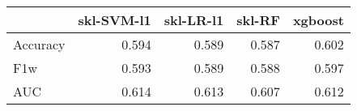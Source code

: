 \begin{tabular}{lrrrr}
\toprule
{} &  skl-SVM-l1 &  skl-LR-l1 &  skl-RF &  xgboost \\
\midrule
Accuracy &       0.594 &      0.589 &   0.587 &    0.602 \\
F1w      &       0.593 &      0.589 &   0.588 &    0.597 \\
AUC      &       0.614 &      0.613 &   0.607 &    0.612 \\
\bottomrule
\end{tabular}
